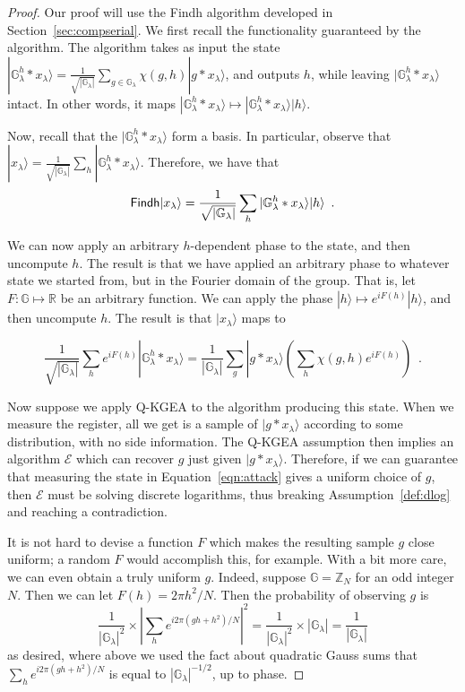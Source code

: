 \documentclass{article}\usepackage[a4paper,margin=20mm]{geometry}
\numberwithin{theorem}{section}
\numberwithin{equation}{section}
\newcommand{\Z}{\mathbb{Z}}
\newcommand{\R}{\mathbb{R}}
\newcommand{\G}{\mathbb{G}}
\newcommand{\Es}{{\mathcal{E}}}
\begin{document}
\begin{proof}Our proof will use the {\sf Findh} algorithm developed in Section~\ref{sec:compserial}. We first recall the functionality guaranteed by the algorithm. The algorithm takes as input the state $|\G_\lambda^h*x_\lambda\rangle=\frac{1}{\sqrt{|\G_\lambda|}}\sum_{g\in\G_\lambda}\chi(g,h)|g*x_\lambda\rangle$, and outputs $h$, while leaving $|\G_\lambda^h*x_\lambda\rangle$ intact. In other words, it maps $|\G_\lambda^h*x_\lambda\rangle\mapsto |\G_\lambda^h*x_\lambda\rangle|h\rangle$.
	
	Now, recall that the $|\G_\lambda^h*x_\lambda\rangle$ form a basis. In particular, observe that $|x_\lambda\rangle=\frac{1}{\sqrt{|\G_\lambda|}}\sum_h|\G_\lambda^h*x_\lambda\rangle$. Therefore, we have that
	\[{\sf Findh}|x_\lambda\rangle=\frac{1}{\sqrt{|\G_\lambda|}}\sum_h|\G_\lambda^h*x_\lambda\rangle|h\rangle\enspace .\]
	
	We can now apply an arbitrary $h$-dependent phase to the state, and then uncompute $h$. The result is that we have applied an arbitrary phase to whatever state we started from, but in the Fourier domain of the group. That is, let $F:\G\mapsto\R$ be an arbitrary function. We can apply the phase $|h\rangle\mapsto e^{iF(h)}|h\rangle$, and then uncompute $h$. The result is that $|x_\lambda\rangle$ maps to
	
	\begin{equation}\label{eqn:attack}\frac{1}{\sqrt{|\G_\lambda|}}\sum_h e^{iF(h)}|\G_\lambda^h*x_\lambda\rangle=\frac{1}{|\G_\lambda|}\sum_{g}|g*x_\lambda\rangle\left(\sum_h\chi(g,h)e^{iF(h)}\right)\enspace .\end{equation}
	
	Now suppose we apply Q-KGEA to the algorithm producing this state. When we measure the register, all we get is a sample of $|g*x_\lambda\rangle$ according to some distribution, with no side information. The Q-KGEA assumption then implies an algorithm $\Es$ which can recover $g$ just given $|g*x_\lambda\rangle$. Therefore, if we can guarantee that measuring the state in Equation~\ref{eqn:attack} gives a uniform choice of $g$, then $\Es$ must be solving discrete logarithms, thus breaking Assumption~\ref{def:dlog} and reaching a contradiction.
	
	It is not hard to devise a function $F$ which makes the resulting sample $g$ close uniform; a random $F$ would accomplish this, for example. With a bit more care, we can even obtain a truly uniform $g$. Indeed, suppose $\G=\Z_N$ for an odd integer $N$. Then we can let $F(h)=2\pi h^2/N$. Then the probability of observing $g$ is 
	\[\frac{1}{|\G_\lambda|^2}\times \left|\sum_he^{i2\pi (gh+h^2)/N}\right|^2=\frac{1}{|\G_\lambda|^2}\times |\G_\lambda|=\frac{1}{|\G_\lambda|}\]
	as desired, where above we used the fact about quadratic Gauss sums that $\sum_he^{i2\pi (gh+h^2)/N}$ is equal to $|\G_\lambda|^{-1/2}$, up to phase.
\end{proof}
\end{document}
